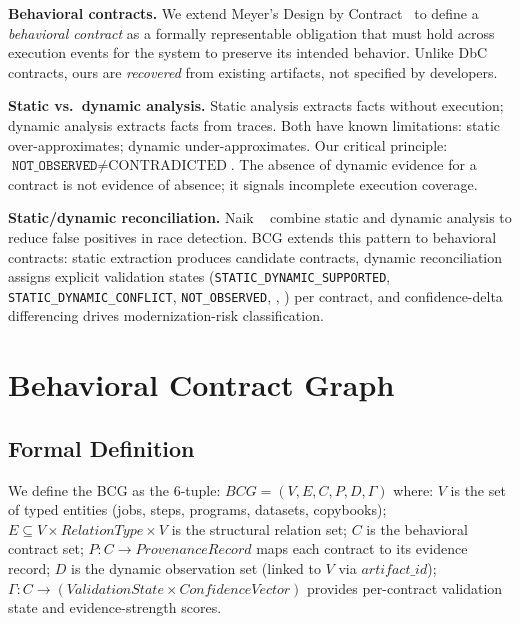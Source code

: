 \documentclass[sigconf,anonymous,review]{acmart}
\newcommand{\bcg}{\textsc{BCG}\xspace}
\newcommand{\notobs}{\texttt{NOT\_OBSERVED}\xspace}
\newcommand{\supported}{\texttt{STATIC\_DYNAMIC\_SUPPORTED}\xspace}
\newcommand{\conflict}{\texttt{STATIC\_DYNAMIC\_CONFLICT}\xspace}
\begin{document}
\textbf{Behavioral contracts.}
We extend Meyer's Design by Contract~\cite{meyer1992applying} to define a
\emph{behavioral contract} as a formally representable obligation that must hold
across execution events for the system to preserve its intended behavior.
Unlike DbC contracts, ours are \emph{recovered} from existing artifacts, not
specified by developers.

\textbf{Static vs.\ dynamic analysis.}
Static analysis extracts facts without execution; dynamic analysis extracts facts
from traces.
Both have known limitations: static over-approximates; dynamic under-approximates.
Our critical principle: $\notobs \neq \text{CONTRADICTED}$.
The absence of dynamic evidence for a contract is not evidence of absence; it signals
incomplete execution coverage.

\textbf{Static/dynamic reconciliation.}
Naik \etal~\cite{naik2006race} combine static and dynamic analysis to reduce
false positives in race detection.
BCG extends this pattern to behavioral contracts: static extraction produces candidate
contracts, dynamic reconciliation assigns explicit validation states
(\supported, \conflict, \notobs, \ambiguous, \partiallysupported) per contract, and
confidence-delta differencing drives modernization-risk classification.

\section{Behavioral Contract Graph}\label{sec:bcg}

\subsection{Formal Definition}

We define the \bcg as the 6-tuple:
$\mathit{BCG} = (V, E, C, P, D, \Gamma)$
where:
$V$ is the set of typed entities (jobs, steps, programs, datasets, copybooks);
$E \subseteq V \times \mathit{RelationType} \times V$ is the structural relation set;
$C$ is the behavioral contract set;
$P: C \to \mathit{ProvenanceRecord}$ maps each contract to its evidence record;
$D$ is the dynamic observation set (linked to $V$ via $\mathit{artifact\_id}$);
$\Gamma: C \to (\mathit{ValidationState} \times \mathit{ConfidenceVector})$ provides
per-contract validation state and evidence-strength scores.
\end{document}
